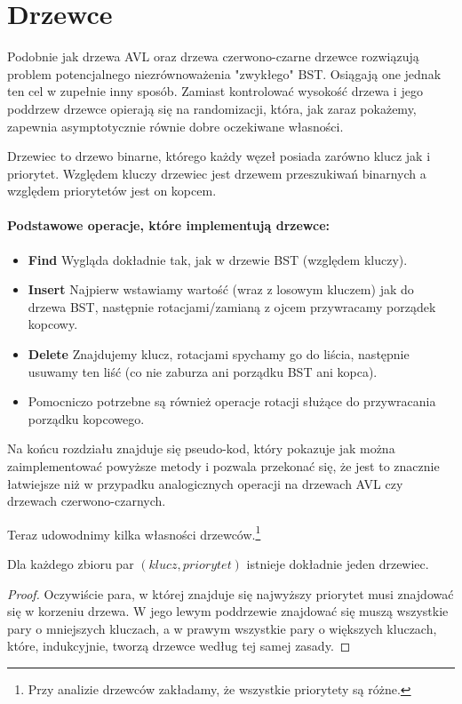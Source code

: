 \section{Drzewce}

\label{sec:drzewce}

Podobnie jak drzewa AVL oraz drzewa czerwono-czarne drzewce rozwiązują problem potencjalnego niezrównoważenia "zwykłego" BST.
Osiągają one jednak ten cel w zupełnie inny sposób.
Zamiast kontrolować wysokość drzewa i jego poddrzew drzewce opierają się na randomizacji, która, jak zaraz pokażemy, zapewnia asymptotycznie równie dobre oczekiwane własności. 

\begin{definition} 
Drzewiec to drzewo binarne, którego każdy węzeł posiada zarówno klucz jak i priorytet.
Względem kluczy drzewiec jest drzewem przeszukiwań binarnych a względem priorytetów jest on kopcem.
\end{definition}

\paragraph{Podstawowe operacje, które implementują drzewce:}
\begin{itemize}
    \item \textbf{Find} Wygląda dokładnie tak, jak w drzewie BST (względem kluczy).
    \item \textbf{Insert} Najpierw wstawiamy wartość (wraz z losowym kluczem) jak do drzewa BST, następnie rotacjami/zamianą z ojcem przywracamy porządek kopcowy.
    \item \textbf{Delete} Znajdujemy klucz, rotacjami spychamy go do liścia, następnie usuwamy ten liść (co nie zaburza ani porządku BST ani kopca).
    \item Pomocniczo potrzebne są również operacje rotacji służące do przywracania porządku kopcowego.
\end{itemize}

Na końcu rozdziału znajduje się pseudo-kod, który pokazuje jak można zaimplementować powyższe metody i pozwala przekonać się, że jest to znacznie łatwiejsze niż w przypadku analogicznych operacji na drzewach AVL czy drzewach czerwono-czarnych.

Teraz udowodnimy kilka własności drzewców.\footnote{Przy analizie drzewców zakładamy, że wszystkie priorytety są różne.}

\begin{theorem}
\label{unique treap}
 Dla każdego zbioru par $(klucz, priorytet)$ istnieje dokładnie jeden drzewiec.
\end{theorem}
\begin{proof}
Oczywiście para, w której znajduje się najwyższy priorytet musi znajdować się w korzeniu drzewa.
W jego lewym poddrzewie znajdować się muszą wszystkie pary o mniejszych kluczach, a w prawym wszystkie pary o większych kluczach, które, indukcyjnie, tworzą drzewce według tej samej zasady.
\end{proof}

